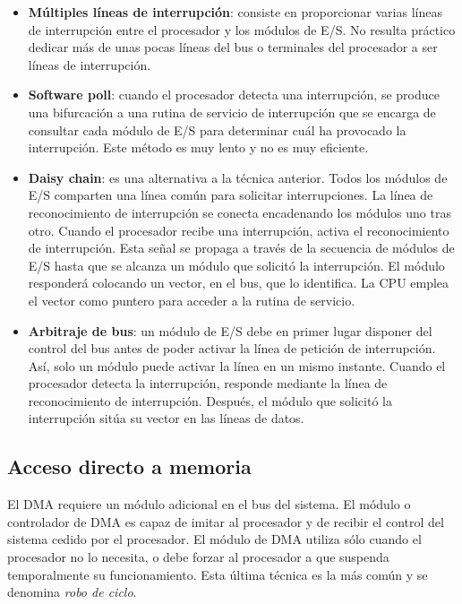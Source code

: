 \begin{subs}
  \begin{itemize}
    \item \textbf{Múltiples líneas de interrupción}: consiste en proporcionar varias líneas de interrupción entre el procesador y los módulos de E/S. No resulta práctico dedicar más de unas pocas líneas del bus o terminales del procesador a ser líneas de interrupción.
    \item \textbf{Software poll}: cuando el procesador detecta una interrupción, se produce una bifurcación a una rutina de servicio de interrupción que se encarga de consultar cada módulo de E/S para determinar cuál ha provocado la interrupción. Este método es muy lento y no es muy eficiente.
    \item \textbf{Daisy chain}: es una alternativa a la técnica anterior. Todos los módulos de E/S comparten una línea común para solicitar interrupciones. La línea de reconocimiento de interrupción se conecta encadenando los módulos uno tras otro. Cuando el procesador recibe una interrupción, activa el reconocimiento de interrupción. Esta señal se propaga a través de la secuencia de módulos de E/S hasta que se alcanza un módulo que solicitó la interrupción. El módulo responderá colocando un vector, en el bus, que lo identifica. La CPU emplea el vector como puntero para acceder a la rutina de servicio.
    \item \textbf{Arbitraje de bus}: un módulo de E/S debe en primer lugar disponer del control del bus antes de poder activar la línea de petición de interrupción. Así, solo un módulo puede activar la línea en un mismo instante. Cuando el procesador detecta la interrupción, responde mediante la línea de reconocimiento de interrupción. Después, el módulo que solicitó la interrupción sitúa su vector en las líneas de datos.
  \end{itemize}
\end{subs}

\subsection{Acceso directo a memoria}

El DMA requiere un módulo adicional en el bus del sistema. El módulo o controlador de DMA es capaz de imitar al procesador y de recibir el control del sistema cedido por el procesador. El módulo de DMA utiliza sólo cuando el procesador no lo necesita, o debe forzar al procesador a que suspenda temporalmente su funcionamiento. Esta última técnica es la más común y se denomina \textit{robo de ciclo}.

